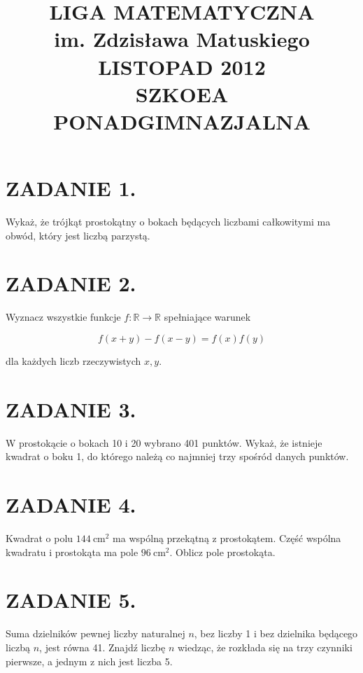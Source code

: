 \documentclass[10pt]{article}
\title{LIGA MATEMATYCZNA \\
 im. Zdzisława Matuskiego \\
 LISTOPAD 2012 \\
 SZKOEA PONADGIMNAZJALNA }
\author{}
\date{}
\begin{document}
\maketitle
\section*{ZADANIE 1.}
Wykaż, że trójkąt prostokątny o bokach będących liczbami całkowitymi ma obwód, który jest liczbą parzystą.

\section*{ZADANIE 2.}
Wyznacz wszystkie funkcje \(f: \mathbb{R} \rightarrow \mathbb{R}\) spełniające warunek

\[
f(x+y)-f(x-y)=f(x) f(y)
\]

dla każdych liczb rzeczywistych \(x, y\).

\section*{ZADANIE 3.}
W prostokącie o bokach 10 i 20 wybrano 401 punktów. Wykaż, że istnieje kwadrat o boku 1, do którego należą co najmniej trzy spośród danych punktów.

\section*{ZADANIE 4.}
Kwadrat o polu \(144 \mathrm{~cm}^{2}\) ma wspólną przekątną z prostokątem. Część wspólna kwadratu i prostokąta ma pole \(96 \mathrm{~cm}^{2}\). Oblicz pole prostokąta.

\section*{ZADANIE 5.}
Suma dzielników pewnej liczby naturalnej \(n\), bez liczby 1 i bez dzielnika będącego liczbą \(n\), jest równa 41. Znajdź liczbę \(n\) wiedząc, że rozkłada się na trzy czynniki pierwsze, a jednym z nich jest liczba 5.
\end{document}
